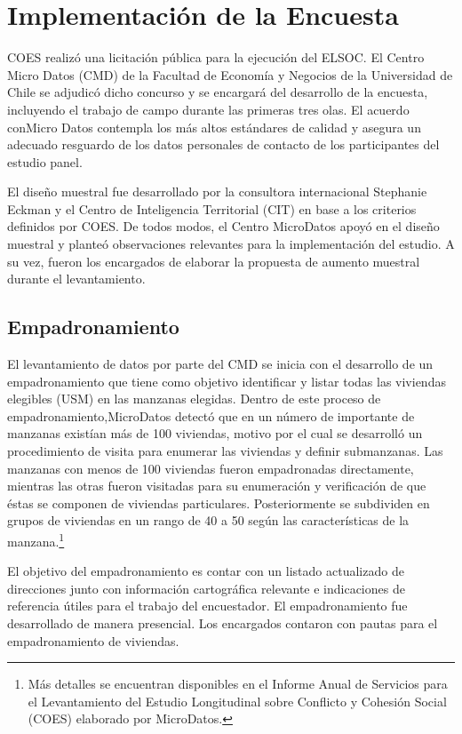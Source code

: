 \documentclass[
]{book}
\begin{document}
\hypertarget{implementaciuxf3n-de-la-encuesta}{%
\chapter{Implementación de la
Encuesta}\label{implementaciuxf3n-de-la-encuesta}}

COES realizó una licitación pública para la ejecución del ELSOC. El
Centro Micro Datos (CMD) de la Facultad de Economía y Negocios de la
Universidad de Chile se adjudicó dicho concurso y se encargará del
desarrollo de la encuesta, incluyendo el trabajo de campo durante las
primeras tres olas. El acuerdo conMicro Datos contempla los más altos
estándares de calidad y asegura un adecuado resguardo de los datos
personales de contacto de los participantes del estudio panel.

El diseño muestral fue desarrollado por la consultora internacional
Stephanie Eckman y el Centro de Inteligencia Territorial (CIT) en base a
los criterios definidos por COES. De todos modos, el Centro MicroDatos
apoyó en el diseño muestral y planteó observaciones relevantes para la
implementación del estudio. A su vez, fueron los encargados de elaborar
la propuesta de aumento muestral durante el levantamiento.

\hypertarget{empadronamiento}{%
\section{Empadronamiento}\label{empadronamiento}}

El levantamiento de datos por parte del CMD se inicia con el desarrollo
de un empadronamiento que tiene como objetivo identificar y listar todas
las viviendas elegibles (USM) en las manzanas elegidas. Dentro de este
proceso de empadronamiento,MicroDatos detectó que en un número de
importante de manzanas existían más de 100 viviendas, motivo por el cual
se desarrolló un procedimiento de visita para enumerar las viviendas y
definir submanzanas. Las manzanas con menos de 100 viviendas fueron
empadronadas directamente, mientras las otras fueron visitadas para su
enumeración y verificación de que éstas se componen de viviendas
particulares. Posteriormente se subdividen en grupos de viviendas en un
rango de 40 a 50 según las características de la manzana.\footnote{Más
  detalles se encuentran disponibles en el Informe Anual de Servicios
  para el Levantamiento del Estudio Longitudinal sobre Conflicto y
  Cohesión Social (COES) elaborado por MicroDatos.}

El objetivo del empadronamiento es contar con un listado actualizado de
direcciones junto con información cartográfica relevante e indicaciones
de referencia útiles para el trabajo del encuestador. El empadronamiento
fue desarrollado de manera presencial. Los encargados contaron con
pautas para el empadronamiento de viviendas.
\end{document}
